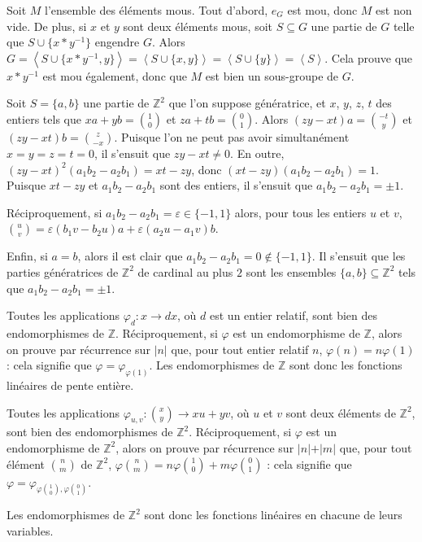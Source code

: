 \begin{sol}
Soit $M$ l'ensemble des éléments mous.
Tout d'abord, $e_G$ est mou, donc $M$ est non vide.
De plus, si $x$ et $y$ sont deux éléments mous, soit
$S \subseteq G$ une partie de $G$ telle que $S \cup \{x \ast y^{-1}\}$
engendre $G$.
Alors $G = \left\langle S \cup \{x \ast y^{-1}, y\} \right\rangle =
\left\langle S \cup \{x, y\} \right\rangle = \left\langle S \cup \{y\} \right\rangle = \left\langle S \right\rangle$.
Cela prouve que $x \ast y^{-1}$ est mou également, donc que $M$
est bien un sous-groupe de $G$.
\end{sol}

\begin{sol}
Soit $S = \{a, b\}$ une partie de $\mathbb{Z}^2$
que l'on suppose génératrice, et $x$, $y$, $z$, $t$ des entiers tels que $x a + y b = \binom{1}{0}$ et
$z a + t b = \binom{0}{1}$.
Alors $(z y - x t) a = \binom{-t}{y}$ et $(z y - x t) b = \binom{z}{-x}$.
Puisque l'on ne peut pas avoir simultanément $x = y = z = t = 0$, il s'ensuit que $z y - x t \neq 0$.
En outre, $(z y - x t)^2 (a_1 b_2 - a_2 b_1) = x t - z y$, donc
$(x t - z y) (a_1 b_2 - a_2 b_1) = 1$.
Puisque $x t - z y$ et $a_1 b_2 - a_2 b_1$ sont des entiers, il s'ensuit que $a_1 b_2 - a_2 b_1 = \pm 1$.

Réciproquement, si $a_1 b_2 - a_2 b_1 = \varepsilon \in \{-1,1\}$ alors, pour tous les entiers $u$ et $v$,
$\binom{u}{v} = \varepsilon (b_1 v - b_2 u) a + \varepsilon (a_2 u - a_1 v) b$.

Enfin, si $a = b$, alors il est clair que $a_1 b_2 - a_2 b_1 = 0 \notin \{-1,1\}$.
Il s'ensuit que les parties génératrices de $\mathbb{Z}^2$ de cardinal au plus $2$ sont les ensembles
$\{a, b\} \subseteq \mathbb{Z}^2$ tels que $a_1 b_2 - a_2 b_1 = \pm 1$.
\end{sol}

\begin{sol}
Toutes les applications $\varphi_d : x \to d x$, où $d$ est un entier relatif,
sont bien des endomorphismes de $\mathbb{Z}$.
Réciproquement, si $\varphi$ est un endomorphisme de $\mathbb{Z}$,
alors on prouve par récurrence sur $\vert n \vert$ que,
pour tout entier relatif $n$, $\varphi(n) = n \varphi(1)$ :
cela signifie que $\varphi = \varphi_{\varphi(1)}$.
Les endomorphismes de $\mathbb{Z}$ sont donc les fonctions linéaires
de pente entière.
\end{sol}

\begin{sol}
Toutes les applications $\varphi_{u,v} : \binom{x}{y} \to x u + y v$,
où $u$ et $v$ sont deux éléments de $\mathbb{Z}^2$,
sont bien des endomorphismes de $\mathbb{Z}^2$.
Réciproquement, si $\varphi$ est un endomorphisme de $\mathbb{Z}^2$,
alors on prouve par récurrence sur $\vert n \vert + \vert m \vert$ que,
pour tout élément $\binom{n}{m}$ de $\mathbb{Z}^2$,
$\varphi\binom{n}{m} = n \varphi\binom{1}{0} + m \varphi\binom{0}{1}$ :
cela signifie que $\varphi = \varphi_{\varphi\binom{1}{0}, \varphi\binom{0}{1}}$.

Les endomorphismes de $\mathbb{Z}^2$ sont donc les fonctions
linéaires en chacune de leurs variables.
\end{sol}

